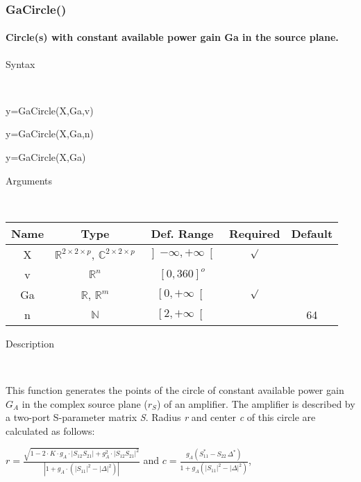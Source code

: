 \subsubsection*{\hypertarget{GaCircle}{}{\Large GaCircle()}}


\paragraph{\label{par:GaCircle}Circle(s) with constant available power gain
Ga in the source plane.}

\begin{description}
\item [Syntax]~
\end{description}
y=GaCircle(X,Ga,v)

\noindent y=GaCircle(X,Ga,n)

\noindent y=GaCircle(X,Ga)

\begin{description}
\item [Arguments]~
\end{description}
\begin{tabular}{|c|c|c|c|c|}
\hline 
Name&
Type&
Def. Range&
Required&
Default\tabularnewline
\hline
\hline 
X&
$\mathbb{R}^{2\times2\times p}$, $\mathbb{C}^{2\times2\times p}$&
$\left]-\infty,+\infty\right[$&
$\surd$&
\tabularnewline
\hline
v&
$\mathbb{R}^{n}$&
$\left[0,360\right]^{o}$&
&
\tabularnewline
\hline
Ga&
$\mathbb{R}$, $\mathbb{R}^{m}$&
$\left[0,+\infty\right[$&
$\surd$&
\tabularnewline
\hline
n&
$\mathbb{N}$&
$\left[2,+\infty\right[$&
&
64\tabularnewline
\hline
\end{tabular}

\begin{description}
\item [Description]~
\end{description}
This function generates the points of the circle of constant available
power gain $G_{A}$ in the complex source plane ($r_{S}$) of an amplifier.
The amplifier is described by a two-port S-parameter matrix \textit{S}.
Radius \textit{r} and center \textit{c} of this circle are calculated
as follows:

\medskip{}
\noindent $r=\frac{{\displaystyle \sqrt{1-2\cdot K\cdot g_{A}\cdot\left|S_{12}S_{21}\right|+g_{A}^{2}\cdot\left|S_{12}S_{21}\right|^{2}}}}{{\displaystyle \left|1+g_{A}\cdot\left(\left|S_{11}\right|^{2}-\left|\Delta\right|^{2}\right)\right|}}$
and $c={\displaystyle \frac{g_{A}\left(S_{11}^{*}-S_{22}\,\Delta{}^{*}\right)}{1+g_{A}\left(\left|S_{11}\right|^{2}-\left|\Delta\right|^{2}\right)}}$,

